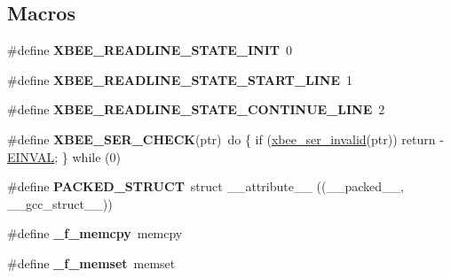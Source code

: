 \subsection*{Macros}
\begin{DoxyCompactItemize}
\item 
\hypertarget{group__hal__win32_ga029adc5ad3f556e4c5671b21529c0dd1}{\#define {\bfseries X\-B\-E\-E\-\_\-\-R\-E\-A\-D\-L\-I\-N\-E\-\_\-\-S\-T\-A\-T\-E\-\_\-\-I\-N\-I\-T}~0}\label{group__hal__win32_ga029adc5ad3f556e4c5671b21529c0dd1}

\item 
\hypertarget{group__hal__win32_gaa3a6d3307bf92060ea7c2664dc9e7b6b}{\#define {\bfseries X\-B\-E\-E\-\_\-\-R\-E\-A\-D\-L\-I\-N\-E\-\_\-\-S\-T\-A\-T\-E\-\_\-\-S\-T\-A\-R\-T\-\_\-\-L\-I\-N\-E}~1}\label{group__hal__win32_gaa3a6d3307bf92060ea7c2664dc9e7b6b}

\item 
\hypertarget{group__hal__win32_ga5eb45373870b820af1c6c5d2918ee9c1}{\#define {\bfseries X\-B\-E\-E\-\_\-\-R\-E\-A\-D\-L\-I\-N\-E\-\_\-\-S\-T\-A\-T\-E\-\_\-\-C\-O\-N\-T\-I\-N\-U\-E\-\_\-\-L\-I\-N\-E}~2}\label{group__hal__win32_ga5eb45373870b820af1c6c5d2918ee9c1}

\item 
\hypertarget{group__hal__win32_ga755b7e850db6200a6f43b741c678ae53}{\#define {\bfseries X\-B\-E\-E\-\_\-\-S\-E\-R\-\_\-\-C\-H\-E\-C\-K}(ptr)~do \{ if (\hyperlink{group__xbee__serial_gae7f838b59f553507bf81a86042fe9cd7}{xbee\-\_\-ser\-\_\-invalid}(ptr)) return -\/\hyperlink{group__hal_ga2d1678d5a7cc8ce499643f3b8957def4}{E\-I\-N\-V\-A\-L}; \} while (0)}\label{group__hal__win32_ga755b7e850db6200a6f43b741c678ae53}

\item 
\hypertarget{group__hal__win32_gafa9179779c676eed926a35c4ab5fe5b5}{\#define {\bfseries P\-A\-C\-K\-E\-D\-\_\-\-S\-T\-R\-U\-C\-T}~struct \-\_\-\-\_\-attribute\-\_\-\-\_\- ((\-\_\-\-\_\-packed\-\_\-\-\_\-, \-\_\-\-\_\-gcc\-\_\-struct\-\_\-\-\_\-))}\label{group__hal__win32_gafa9179779c676eed926a35c4ab5fe5b5}

\item 
\hypertarget{group__hal__win32_ga3ee5b5bde5321e97420753cf13ce9c1b}{\#define {\bfseries \-\_\-f\-\_\-memcpy}~memcpy}\label{group__hal__win32_ga3ee5b5bde5321e97420753cf13ce9c1b}

\item 
\hypertarget{group__hal__win32_ga210604a4d70c1421599afca049c8dc55}{\#define {\bfseries \-\_\-f\-\_\-memset}~memset}\label{group__hal__win32_ga210604a4d70c1421599afca049c8dc55}


\end{DoxyCompactItemize}
